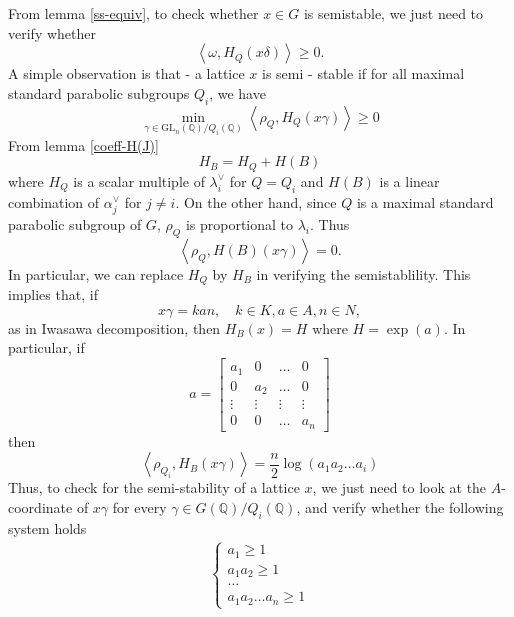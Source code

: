 From lemma \ref{ss-equiv}, to check whether $x \in G$ is semistable, we just need to verify whether $$\left\langle \omega,H_Q(x\delta)\right\rangle \ge 0.$$
A simple observation is that - a lattice $x$ is semi - stable if for all maximal standard parabolic subgroups
$Q_i$, we have
\[\min_{\gamma \in \text{GL}_n(\mathbb{Q})/Q_i(\mathbb{Q})}\left\langle \rho_Q, H_Q(x\gamma) \right\rangle \ge 0\]
From lemma \ref{coeff-H(J)}
\[H_B = H_Q+H(B)\]
where $H_Q$ is a scalar multiple of $\lambda_i^\vee$ for $Q = Q_i$ and $H(B)$ is a linear combination of $\alpha_j^\vee$ for $ j \ne i$.
On the other hand, since $Q$ is a maximal standard parabolic subgroup of $G$,
$\rho_Q$ is proportional to $\lambda_i.$ Thus $$\left\langle \rho_Q,H(B)(x\gamma)\right\rangle =0.$$ In particular, we can replace $H_Q$ by $H_B$ in verifying the semistablility.
This implies that, if
\[ x\gamma = kan, \quad k \in K, a \in A, n \in N,\]
as in Iwasawa decomposition, then $H_B(x) = H$ where $H = \exp(a)$. In particular, if
\[a = \begin{bmatrix}
        a_1    & 0      & \ldots & 0      \\
        0      & a_2    & \ldots & 0      \\
        \vdots & \vdots & \vdots & \vdots \\
        0      & 0      & \ldots & a_n
    \end{bmatrix}\]
then
\[\left\langle \rho_{Q_i}, H_B(x\gamma) \right\rangle = \dfrac{n}{2}\log(a_1a_2\ldots a_i)\]
Thus, to check for the semi-stability of a lattice $x$, we just need to look at the
$A$-coordinate of $x\gamma$ for every $\gamma \in G(\mathbb{Q})/Q_i(\mathbb{Q})$, and verify whether the following system holds
\begin{align*}
    \begin{cases}
        a_1 \ge 1   \\
        a_1a_2\ge 1 \\
        \ldots      \\
        a_1a_2\ldots a_n \ge 1
    \end{cases}
\end{align*}
